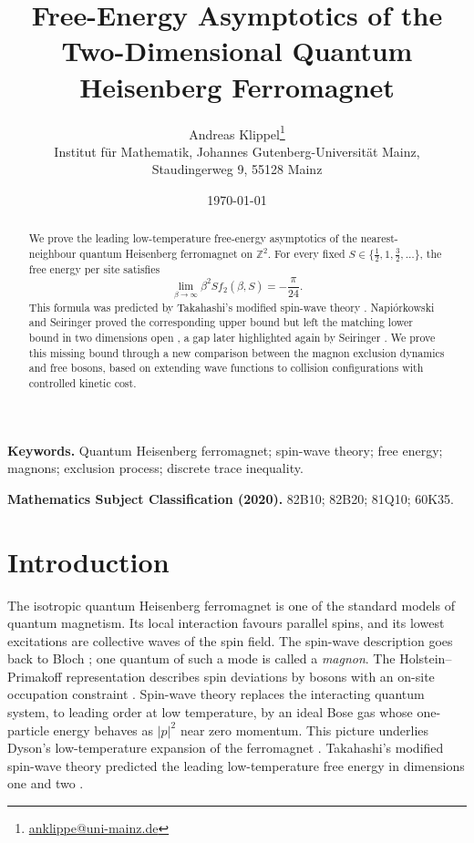 \documentclass[11pt]{article}
\title{Free-Energy Asymptotics of the Two-Dimensional Quantum Heisenberg Ferromagnet}
\author{Andreas Klippel\thanks{ \href{mailto:anklippe@uni-mainz.de}{anklippe@uni-mainz.de}}\\[0.35em]
\small Institut für Mathematik, Johannes Gutenberg-Universität Mainz,\\[-0.1em]
\small Staudingerweg 9, 55128 Mainz}
\date{\today}
\numberwithin{equation}{section}
\theoremstyle{remark}
\newcommand{\1}{\mathbf 1}
\begin{document}
\maketitle

\begin{abstract}
We prove the leading low-temperature free-energy asymptotics of the
nearest-neighbour quantum Heisenberg ferromagnet on \(\mathbb Z^2\).  For
every fixed \(S\in\{\frac12,1,\frac32,\ldots\}\), the free energy per site
satisfies
\[
 \lim_{\beta\to\infty}\beta^2S f_2(\beta,S)=-\frac{\pi}{24}.
\]
This formula was predicted by Takahashi's modified spin-wave theory
\cite{Takahashi1986}.  Napiórkowski and Seiringer proved the corresponding
upper bound but left the matching lower bound in two dimensions open
\cite{NapiorkowskiSeiringer2021}, a gap later highlighted again by
Seiringer \cite{SeiringerOberwolfach2025}.  We prove this missing bound
through a new comparison between the magnon exclusion dynamics and free
bosons, based on extending wave functions to collision configurations with
controlled kinetic cost.
\end{abstract}

\medskip
\noindent\textbf{Keywords.} Quantum Heisenberg ferromagnet; spin-wave
theory; free energy; magnons; exclusion process; discrete trace inequality.

\smallskip
\noindent\textbf{Mathematics Subject Classification (2020).}
82B10; 82B20; 81Q10; 60K35.

\section{Introduction}
\label{sec:introduction}

The isotropic quantum Heisenberg ferromagnet is one of the standard models
of quantum magnetism.  Its local interaction favours parallel spins, and
its lowest excitations are collective waves of the spin field.  The
spin-wave description goes back to Bloch \cite{Bloch1930}; one quantum of
such a mode is called a \emph{magnon}.
The Holstein--Primakoff representation describes spin deviations by
bosons with an on-site occupation constraint
\cite{HolsteinPrimakoff1940}.  Spin-wave theory replaces the interacting
quantum system, to leading order at low temperature, by an ideal Bose gas
whose one-particle energy behaves as \(|p|^2\) near zero momentum.  This
picture underlies Dyson's low-temperature expansion of the ferromagnet
\cite{Dyson1956,Dyson1956Thermodynamics}.
Takahashi's modified spin-wave theory predicted the leading
low-temperature free energy in dimensions one and two
\cite{Takahashi1986}.
\end{document}
